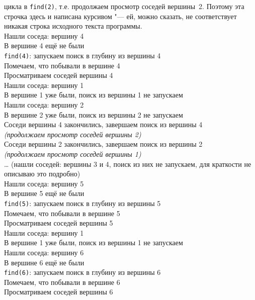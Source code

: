 {{              цикла в \texttt{find(2)}, т.е. продолжаем просмотр соседей вершины~2. Поэтому эта строчка здесь и написана 
              курсивом "--- ей, можно сказать, не соответствует никакая строка исходного текста 
              программы.}%
              \\
\ind Нашли соседа: вершину 4\\
\ind В вершине 4 ещё не были\\
\ind \ind \texttt{find(4)}: запускаем поиск в глубину из вершины 4\\
\ind \ind Помечаем, что побывали в вершине 4\\
\ind \ind Просматриваем соседей вершины 4\\
\ind \ind Нашли соседа: вершину 1\\
\ind \ind В вершине 1 уже были, поиск из вершины 1 не запускаем\\
\ind \ind Нашли соседа: вершину 2\\
\ind \ind В вершине 2 уже были, поиск из вершины 2 не запускаем\\
\ind \ind Соседи вершины 4 закончились, завершаем поиск из вершины 4\\
\ind \textit{(продолжаем просмотр соседей вершины 2)}\\
\ind Соседи вершины 2 закончились, завершаем поиск из вершины 2\\
\textit{(продолжаем просмотр соседей вершины 1)}\\
\dots{} (нашли соседей: вершины 3 и 4, поиск из них не запускаем, для краткости не описываю это подробно)\\
Нашли соседа: вершину 5\\
В вершине 5 ещё не были\\
\ind \texttt{find(5)}: запускаем поиск в глубину из вершины 5\\
\ind Помечаем, что побывали в вершине 5\\
\ind Просматриваем соседей вершины 5\\
\ind Нашли соседа: вершину 1\\
\ind В вершине 1 уже были, поиск из вершины 1 не запускаем\\
\ind Нашли соседа: вершину 6\\
\ind В вершине 6 ещё не были\\
\ind \ind \texttt{find(6)}: запускаем поиск в глубину из вершины 6\\
\ind \ind Помечаем, что побывали в вершине 6\\
\ind \ind Просматриваем соседей вершины 6\\
}
